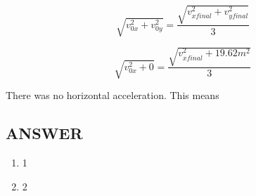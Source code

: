 $$ \sqrt{v_{0x}^2 + v_{0y}^2} = \frac{\sqrt{v_{xfinal}^2 + v_{yfinal}^2}}{3} $$

$$ \sqrt{v_{0x}^2 + 0} = \frac{\sqrt{v_{xfinal}^2 + 19.62m^2}}{3} $$

There was no horizontal acceleration. This means 









\vfill
\subsection*{ANSWER}
\begin{enumerate}
    \item 1
    \item 2
\end{enumerate}
